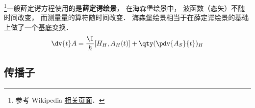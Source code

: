 
\footnote{参考 Wikipedia \href{https://en.wikipedia.org/wiki/Heisenberg_picture}{相关页面}．}一般薛定谔方程使用的是\textbf{薛定谔绘景}， 在海森堡绘景中， 波函数（态矢）不随时间改变， 而测量量的算符随时间改变． 海森堡绘景相当于在薛定谔绘景的基础上做了一个基底变换．
\begin{equation}
\dv{t}A = \frac{\I}{\hbar} [H_H, A_H(t)] + \qty(\pdv{A_S}{t})_H
\end{equation}

\subsection{传播子}

